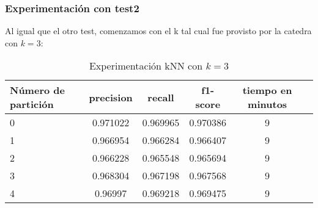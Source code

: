 \subsubsection{Experimentaci\'on con test2}

Al igual que el otro test, comenzamos con el k tal cual fue provisto por la catedra con $k = 3$:
\begin{table}[H]
\centering
\begin{tabular}{| l | c | c | c | c | c |}
\hline
N\'umero de partici\'on & precision & recall & f1-score & tiempo en minutos \\
\hline

0 & 0.971022 & 0.969965 & 0.970386 & 9 \\
1 & 0.966954 & 0.966284 & 0.966407 & 9 \\
2 & 0.966228 & 0.965548 & 0.965694 & 9 \\
3 & 0.968304 & 0.967198 & 0.967568 & 9 \\
4 & 0.96997 & 0.969218 & 0.969475 & 9 \\

\hline
\end{tabular}
\caption{Experimentaci\'on kNN con $k=3$}

\end{table}
